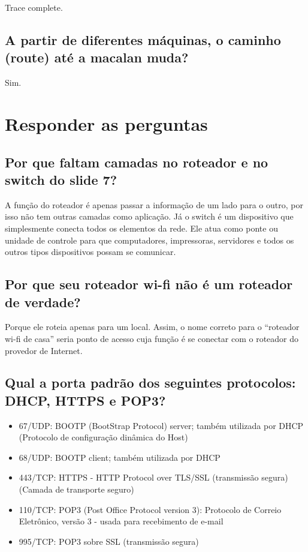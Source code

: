 \documentclass{article}
\begin{document}
Trace complete.


\subsection{A partir de diferentes máquinas, o caminho (route) até a macalan muda?}
Sim.

\paragraph{}
\paragraph{}
\section{Responder as perguntas}

\subsection{Por que faltam camadas no roteador e no switch do slide 7?}

A função do roteador é apenas passar a informação de um lado para o outro, por isso não tem outras camadas como aplicação. Já o switch é um dispositivo que simplesmente conecta todos os elementos da rede. Ele atua como ponte ou unidade de controle para que computadores, impressoras, servidores e todos os outros tipos dispositivos possam se comunicar.

\subsection{Por que seu roteador wi-fi não é um roteador de verdade?}
Porque ele roteia apenas para um local. Assim, o nome correto para o “roteador wi-fi de casa” seria ponto de acesso cuja função é se conectar com o roteador do provedor de Internet. 

\subsection{Qual a porta padrão dos seguintes protocolos: DHCP, HTTPS e POP3?}

\begin{itemize}
\item 67/UDP: BOOTP (BootStrap Protocol) server; também utilizada por DHCP (Protocolo de configuração dinâmica do Host)
\item 68/UDP: BOOTP client; também utilizada por DHCP
\item 443/TCP: HTTPS - HTTP Protocol over TLS/SSL (transmissão segura)(Camada de transporte seguro)
\item 110/TCP: POP3 (Post Office Protocol version 3): Protocolo de Correio Eletrônico, versão 3 - usada para recebimento de e-mail
\item 995/TCP: POP3 sobre SSL (transmissão segura)
\end{itemize}
\end{document}
